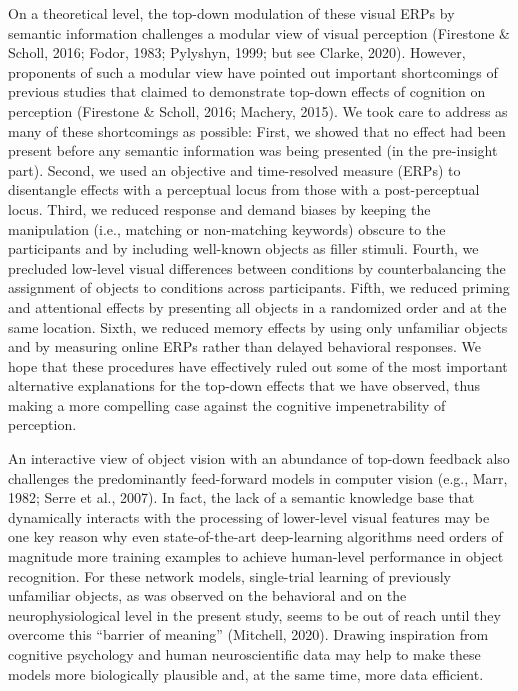 \documentclass[
  english,
  doc,12pt,twoside,floatsintext]{apa7}
\begin{document}
On a theoretical level, the top-down modulation of these visual ERPs by semantic information challenges a modular view of visual perception (Firestone \& Scholl, 2016; Fodor, 1983; Pylyshyn, 1999; but see Clarke, 2020). However, proponents of such a modular view have pointed out important shortcomings of previous studies that claimed to demonstrate top-down effects of cognition on perception (Firestone \& Scholl, 2016; Machery, 2015). We took care to address as many of these shortcomings as possible: First, we showed that no effect had been present before any semantic information was being presented (in the pre-insight part). Second, we used an objective and time-resolved measure (ERPs) to disentangle effects with a perceptual locus from those with a post-perceptual locus. Third, we reduced response and demand biases by keeping the manipulation (i.e., matching or non-matching keywords) obscure to the participants and by including well-known objects as filler stimuli. Fourth, we precluded low-level visual differences between conditions by counterbalancing the assignment of objects to conditions across participants. Fifth, we reduced priming and attentional effects by presenting all objects in a randomized order and at the same location. Sixth, we reduced memory effects by using only unfamiliar objects and by measuring online ERPs rather than delayed behavioral responses. We hope that these procedures have effectively ruled out some of the most important alternative explanations for the top-down effects that we have observed, thus making a more compelling case against the cognitive impenetrability of perception.

An interactive view of object vision with an abundance of top-down feedback also challenges the predominantly feed-forward models in computer vision (e.g., Marr, 1982; Serre et al., 2007). In fact, the lack of a semantic knowledge base that dynamically interacts with the processing of lower-level visual features may be one key reason why even state-of-the-art deep-learning algorithms need orders of magnitude more training examples to achieve human-level performance in object recognition. For these network models, single-trial learning of previously unfamiliar objects, as was observed on the behavioral and on the neurophysiological level in the present study, seems to be out of reach until they overcome this ``barrier of meaning'' (Mitchell, 2020). Drawing inspiration from cognitive psychology and human neuroscientific data may help to make these models more biologically plausible and, at the same time, more data efficient.
\end{document}
